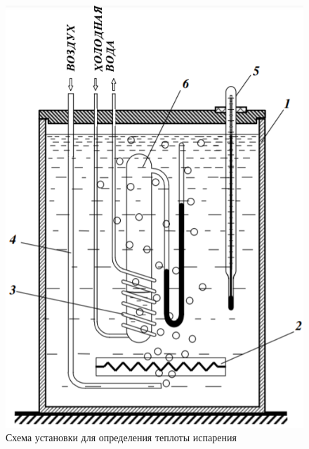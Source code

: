 \documentclass[a4paper,12pt]{article} %
\begin{document}
	\begin{figure}[h!]
		\centering
		\includegraphics[scale = 0.7]{Установка.png}
		\caption{Схема установки для определения теплоты испарения}
	\end{figure}

	\newpage
	
\end{document}
